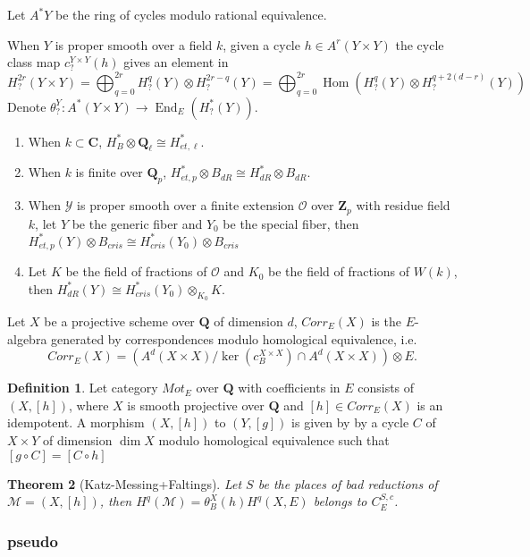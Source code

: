 \documentclass[leqno]{amsart}
\newcommand{\Q}{{\mathbf{Q}}}
\newcommand{\Qp}{\mathbf{Q}_p}
\newcommand{\Zp}{\mathbf{Z}_p}
\newcommand{\Ql}{\mathbf{Q}_\ell}
\newcommand{\C}{\mathbf C}
\newcommand{\oo}{\mathcal O}
\newcommand{\1}{\mathbf{1}}
\DeclareMathOperator{\End}{End}
\DeclareMathOperator{\Hom}{Hom}
\newtheorem{thm}{Theorem}[section]
\theoremstyle{definition}
\newtheorem{defn}[thm]{Definition}
\theoremstyle{remark}
\begin{document}
Let $A^*Y$ be the ring of cycles modulo rational equivalence.

When $Y$ is proper smooth over a field $k$,
given a cycle $h\in A^r(Y\times Y)$
the cycle class map  $c^{Y\times Y}_?(h)$ 
gives an element in
\[
	H^{2r}_?(Y\times Y)=
	\bigoplus_{q=0}^{2r} H^q_?(Y)\otimes H^{2r-q}_?(Y)=
	\bigoplus_{q=0}^{2r}\Hom(H^q_?(Y)\otimes H^{q+2(d-r)}_?(Y))
\]
Denote $\theta^Y_?\colon A^*(Y\times Y)\to \End_E(H^*_?(Y))$.
\begin{enumerate}[label=(\alph*)]
	\item When $k\subset \C$,
		 $H^*_B\otimes\Ql\cong H^*_{{e}t,\ell}$.
	 \item When $k$ is finite over  $\Qp$,
		  $H^*_{{e}t,p}\otimes B_{dR}\cong 
		  H^*_{dR}\otimes B_{dR}$.
	  \item When $\mathcal{Y}$ is proper smooth over 
		  a finite extension $\oo$ over  $\Zp$
		  with residue field  $k$, let
		  $Y$ be the generic fiber and 
		  $Y_0$ be the special fiber, then
		  $H^*_{{e}t,p}(Y)\otimes B_{cris}\cong
		   H^*_{cris}(Y_0)\otimes B_{cris}$
	   \item Let
		   $K$ be the field of fractions of  $\oo$ and 
		   $K_0$ be the field of fractions of $W(k)$,
		   then  $H^*_{dR}(Y)\cong 
		   H^*_{cris}(Y_0)\otimes_{K_0}K$.
\end{enumerate}

Let $X$ be a projective scheme over  $\Q$ of dimension  $d$,
$Corr_E(X)$ is the $E$-algebra generated by
correspondences modulo homological equivalence, i.e.
 \[
	 Corr_E(X)=
	 (A^d(X\times X)/\ker(c^{X\times X}_B)\cap A^d(X\times X))
	 \otimes E.
\]

\begin{defn}
	Let category $Mot_E$ over $\Q$
	with coefficients in $E$
	consists of $(X,[h])$,
	where $X$ is smooth projective over $\Q$
	and $[h]\in Corr_E(X)$ is an idempotent.
	A morphism $(X,[h])$ to $(Y,[g])$
	is given by by a cycle  $C$ of $X\times Y$
	of dimension  $\dim X$
	modulo homological equivalence such that 
	$[g\circ C]=[C\circ h]$
\end{defn}

\begin{thm}[Katz-Messing+Faltings]
	Let $S$ be the places of bad reductions 
	of  $\mathcal{M}=(X,[h])$, then 
	$H^q(\mathcal{M})=\theta^X_B(h)H^q(X,E)$ 
	belongs to $C_E^{S,c}$.
\end{thm}

\subsubsection{pseudo}
\end{document}
